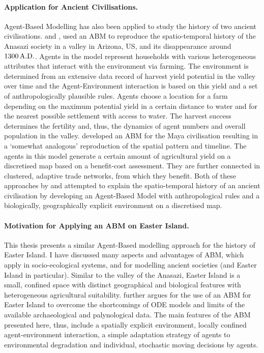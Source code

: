 \paragraph{Application for Ancient Civilisations.}
Agent-Based Modelling has also been applied to study the history of two ancient civilisations.
\citet{Axtell2002} and \citet{Janssen2009}, used an ABM to reproduce the spatio-temporal history of the Anasazi society in a valley in Arizona, US, and its disappearance around $1300\, {\rm A.D.}$. 
Agents in the model represent households with various heterogeneous attributes that interact with the environment via farming. 
The environment is determined from an extensive data record of harvest yield potential in the valley over time and the Agent-Environment interaction is based on this yield and a set of anthropologically plausible rules.
Agents choose a location for a farm depending on the maximum potential yield in a certain distance to water and for the nearest possible settlement with access to water. 
The harvest success determines the fertility and, thus, the dynamics of agent numbers and overall population in the valley.
\citet{Heckbert2013} developed an ABM for the Maya civilisation resulting in a `somewhat analogous' reproduction of the spatial pattern and timeline.
The agents in this model generate a certain amount of agricultural yield on a discretised map based on a benefit-cost assessment. 
They are further connected in clustered, adaptive trade networks, from which they benefit.
Both of these approaches by \citet{Axtell2002} and \citet{Heckbert2013} attempted to explain the spatio-temporal history of an ancient civilisation by developing an Agent-Based Model with anthropological rules and a biologically, geographically explicit environment on a discretised map.


\paragraph{Motivation for Applying an ABM on Easter Island.}
This thesis presents a similar Agent-Based modelling approach for the history of Easter Island.
I have discussed many aspects and advantages of ABM, which apply in socio-ecological systems, and for modelling ancient societies (and Easter Island in particular).
Similar to the valley of the Anasazi, Easter Island is a small, confined space with distinct geographical and biological features with heterogeneous agricultural suitability.
\citet{Merico2017} further argues for the use of an ABM for Easter Island to overcome the shortcomings of ODE models and limits of the available archaeological and palynological data.
The main features of the ABM presented here, thus, include a spatially explicit environment, locally confined agent-environment interaction, a simple adaptation strategy of agents to environmental degradation and individual, stochastic moving decisions by agents.

